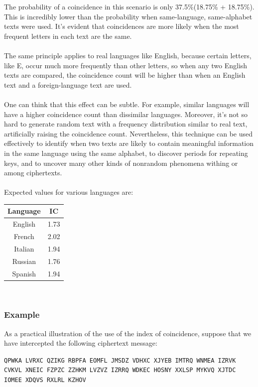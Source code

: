 \documentclass[Lau,binding=0.6cm,oneside]{sapthesis}
\begin{document}
The probability of a coincidence in this scenario is only 37.5\%(18.75\% + 18.75\%). This is incredibly lower than the probability when same-language, same-alphabet texts were used. It's evident that coincidences are more likely when the most frequent letters in each text are the same.\\\\
The same principle applies to real languages like English, because certain letters, like E, occur much more frequently than other letters, so when any two English texts are compared, the coincidence count will be higher than when an English text and a foreign-language text are used.\\\\
One can think that this effect can be subtle. For example, similar languages will have a higher coincidence count than dissimilar languages. Moreover, it's not so hard to generate random text with a frequency distribution similar to real text, artificially raising the coincidence count. Nevertheless, this technique can be used effectively to identify when two texts are likely to contain meaningful information in the same language using the same alphabet, to discover periods for repeating keys, and to uncover many other kinds of nonrandom phenomena withing or among ciphertexts.\\\\
Expected values for various languages are:\\

\begin{center}
 \begin{tabular}{||c c||} 
 \hline
 Language & IC\\ [0.5ex] 
 \hline\hline
 English & 1.73 \\ 
 \hline
 French & 2.02 \\
 \hline
 Italian & 1.94 \\
 \hline
 Russian & 1.76 \\
 \hline
 Spanish & 1.94 \\
 \hline
\end{tabular}
\end{center}
\ \\

\subsubsection{Example}
As a practical illustration of the use of the index of coincidence, suppose that we have intercepted the following ciphertext message:
\begin{displayquote}{\small{\texttt{QPWKA LVRXC QZIKG RBPFA EOMFL  JMSDZ VDHXC XJYEB IMTRQ WNMEA IZRVK CVKVL XNEIC FZPZC ZZHKM  LVZVZ IZRRQ WDKEC HOSNY XXLSP
MYKVQ XJTDC IOMEE XDQVS RXLRL  KZHOV}}}
\end{displayquote}
\end{document}
